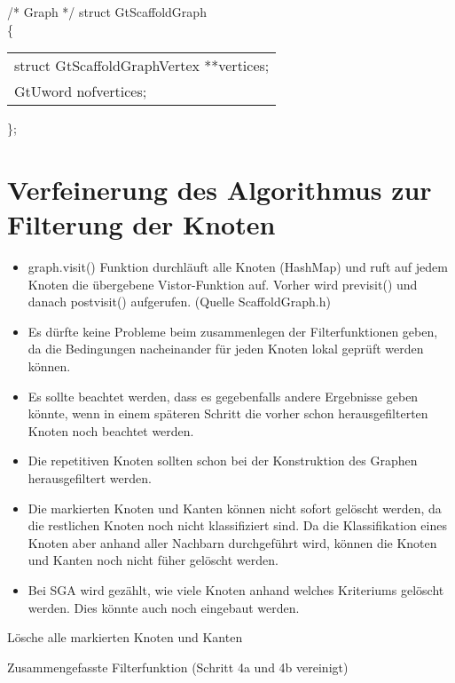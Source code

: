 \documentclass[a4paper,10pt,parskip]{scrartcl}
\begin{document}
/* Graph */
struct GtScaffoldGraph\\
\{\\
\begin{tabular}{l}
  struct GtScaffoldGraphVertex **vertices;\\
  GtUword nofvertices;
\end{tabular}
\};

\section{Verfeinerung des Algorithmus zur Filterung der Knoten}

\begin{itemize}
\item graph.visit() Funktion durchläuft alle Knoten (HashMap) und ruft
  auf jedem Knoten die übergebene Vistor-Funktion auf. Vorher wird
  previsit() und danach postvisit() aufgerufen. (Quelle
  ScaffoldGraph.h)
\item Es dürfte keine Probleme beim zusammenlegen der Filterfunktionen
  geben, da die Bedingungen nacheinander für jeden Knoten lokal
  geprüft werden können.
\item Es sollte beachtet werden, dass es gegebenfalls andere
  Ergebnisse geben könnte, wenn in einem späteren Schritt die vorher
  schon herausgefilterten Knoten noch beachtet werden.
\item Die repetitiven Knoten sollten schon bei der Konstruktion des
  Graphen herausgefiltert werden.
\item Die markierten Knoten und Kanten können nicht sofort gelöscht
  werden, da die restlichen Knoten noch nicht klassifiziert sind. Da
  die Klassifikation eines Knoten aber anhand aller Nachbarn
  durchgeführt wird, können die Knoten und Kanten noch nicht füher
  gelöscht werden.
\item Bei SGA wird gezählt, wie viele Knoten anhand welches Kriteriums
  gelöscht werden. Dies könnte auch noch eingebaut werden.
\end{itemize}

\begin{algorithm}[H]
  Lösche alle markierten Knoten und Kanten\;
  \caption{Zusammengefasste Filterfunktion (Schritt 4a und 4b vereinigt)}
\end{algorithm}
\end{document}
